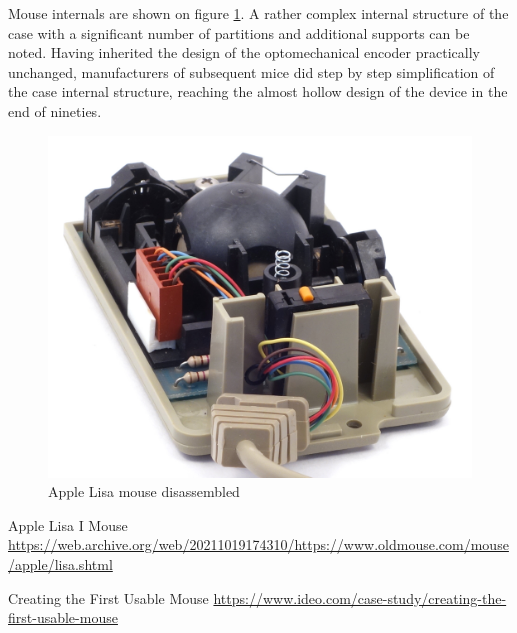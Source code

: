 \documentclass[11pt, a4paper]{article}
\begin{document}
Mouse internals are shown on figure \ref{fig:AppleLisaInside}. A rather complex internal structure of the case with a significant number of partitions and additional supports can be noted. Having inherited the design of the optomechanical encoder practically unchanged, manufacturers of subsequent mice did step by step simplification of the case internal structure, reaching the almost hollow design of the device in the end of nineties.

 \begin{figure}[h]
    \centering
    \includegraphics[scale=0.6]{1983_apple_lisa_mouse/appleraz_60.jpg}
    \caption{Apple Lisa mouse disassembled}
    \label{fig:AppleLisaInside}
\end{figure}

\begin{thebibliography}{9}
 Apple Lisa I Mouse \url{https://web.archive.org/web/20211019174310/https://www.oldmouse.com/mouse/apple/lisa.shtml}

 Creating the First Usable Mouse \url{https://www.ideo.com/case-study/creating-the-first-usable-mouse}
\end{thebibliography}
\end{document}
